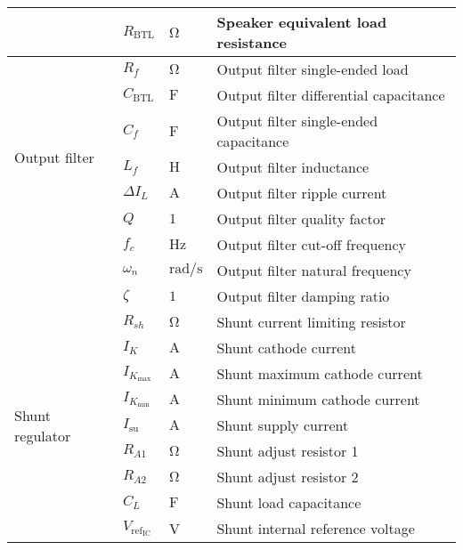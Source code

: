 \begin{longtable}{@{}llll@{}}
	& $R_{\mathrm{BTL}}$ & $\si{\ohm}$ & Speaker equivalent load resistance \\ \midrule
	\multirow{7}{*}{Output filter}  & $R_{f}$ & $\si{\ohm}$ & Output filter single-ended load \\
	& $C_{\mathrm{BTL}}$ & $\si{\farad}$ & Output filter differential capacitance \\
	& $C_{f}$ & $\si{\farad}$ & Output filter single-ended capacitance \\
	& $L_{f}$ & $\si{\henry}$ & Output filter inductance \\
	& $\Delta I_{L}$ & $\si{\ampere}$ & Output filter ripple current \\
	& $Q$ & $1$ & Output filter quality factor \\
	& $f_{c}$ & $\si{\hertz}$ & Output filter cut-off frequency \\ 
	& $\omega_{n}$ & $\si{\radian\per\second}$ & Output filter natural frequency \\
	& $\zeta$ & $1$ & Output filter damping ratio \\ \midrule
	\multirow{9}{*}{Shunt regulator}  & $R_{sh}$ & $\si{\ohm}$ & Shunt current limiting resistor \\
	& $I_{K}$ & $\si{\ampere}$ & Shunt cathode current \\
	& $I_{K_{\mathrm{max}}}$ & $\si{\ampere}$ & Shunt maximum cathode current \\
	& $I_{K_{\mathrm{min}}}$ & $\si{\ampere}$ & Shunt minimum cathode current \\
	& $I_{\mathrm{su}}$ & $\si{\ampere}$ & Shunt supply current \\
	& $R_{A1}$ & $\si{\ohm}$ & Shunt adjust resistor 1 \\
	& $R_{A2}$ & $\si{\ohm}$ & Shunt adjust resistor 2 \\
	& $C_{L}$ & $\si{\farad}$ & Shunt load capacitance \\
	& $V_{\mathrm{ref}_{\mathrm{IC}}}$ & \si{\volt} & Shunt internal reference voltage
	\label{tab:denotation}
\end{longtable}